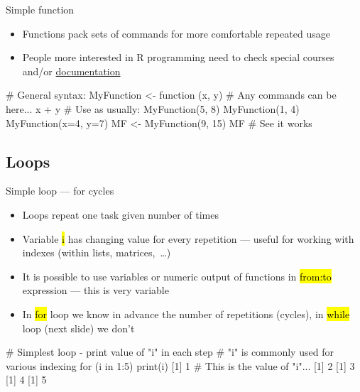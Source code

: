 \documentclass[compress, ucs, xelatex, 11pt, xcolor=svgnames,
	hyperref={
		bookmarks=true,
		unicode=true,
		colorlinks=true,
		pdftitle={Molecular data in R},
		plainpages=false,
		pdfauthor={Vojtech Zeisek},
		pdfsubject={Course about phylogeny and evolution in R},
		pdfcreator={XeLaTeX},
		pdfkeywords={R, evolution, phylogeny, molecular data},
		linkcolor=Tomato,
		anchorcolor=SaddleBrown,
		citecolor=Goldenrod,
		filecolor=DarkMagenta,
		menucolor=Sienna,
		urlcolor=DarkTurquoise,
		pdftex},
	url={hyphens, lowtilde} %
	]{beamer}
\renewcommand{\texttt}[1]{\hl{\ttfamily #1}}
\begin{document}
\begin{frame}[fragile]{Simple function}
	\begin{itemize}
		\item Functions pack sets of commands for more comfortable repeated usage
		\item People more interested in R programming need to check special courses and/or \href{https://CRAN.R-project.org/manuals.html}{documentation}
	\end{itemize}
	\begin{spluscode}
    # General syntax:
    MyFunction <- function (x, y) {
      # Any commands can be here...
      x + y
      }
    # Use as usually:
    MyFunction(5, 8)
    MyFunction(1, 4)
    MyFunction(x=4, y=7)
    MF <- MyFunction(9, 15)
    MF # See it works
	\end{spluscode}
\end{frame}

\subsection{Loops}

\begin{frame}[fragile]{Simple loop --- for cycles}
	\begin{itemize}
		\item Loops repeat one task given number of times
		\item Variable \texttt{i} has changing value for every repetition --- useful for working with indexes (within lists, matrices,~\ldots)
		\item It is possible to use variables or numeric output of functions in \texttt{from:to} expression --- this is very variable
		\item In \texttt{for} loop we know in advance the number of repetitions (cycles), in \texttt{while} loop (next slide) we don't
	\end{itemize}
	\begin{spluscode}
    # Simplest loop - print value of "i" in each step
    # "i" is commonly used for various indexing
    for (i in 1:5) { print(i) }
    [1] 1 # This is the value of "i"...
    [1] 2
    [1] 3
    [1] 4
    [1] 5
	\end{spluscode}
\end{frame}
\end{document}
